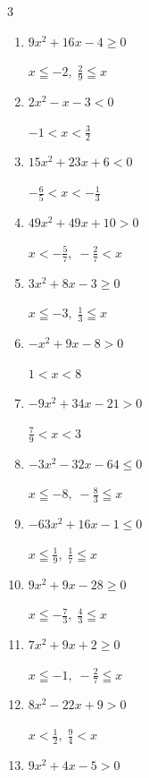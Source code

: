 \begin{multicols}{3}
\begin{enumerate}
  \item $9x^{2}+16x-4\geq 0$

        $\displaystyle x \leqq -2 , \; \frac{2}{9} \leqq x$

  \item $2x^{2}-x-3<0$

        $\displaystyle -1 < x < \frac{3}{2}$

  \item $15x^{2}+23x+6<0$

        $\displaystyle -\frac{6}{5} < x < -\frac{1}{3}$

  \item $49x^{2}+49x+10>0$

        $\displaystyle x < -\frac{5}{7} , \; -\frac{2}{7} < x$

  \item $3x^{2}+8x-3\geq 0$

        $\displaystyle x \leqq -3 , \; \frac{1}{3} \leqq x$

  \item $-x^{2}+9x-8>0$

        $\displaystyle 1 < x < 8$

  \item $-9x^{2}+34x-21>0$

        $\displaystyle \frac{7}{9} < x < 3$

  \item $-3x^{2}-32x-64\leq 0$

        $\displaystyle x \leqq -8 , \; -\frac{8}{3} \leqq x$

  \item $-63x^{2}+16x-1\leq 0$

        $\displaystyle x \leqq \frac{1}{9} , \; \frac{1}{7} \leqq x$

  \item $9x^{2}+9x-28\geq 0$

        $\displaystyle x \leqq -\frac{7}{3} , \; \frac{4}{3} \leqq x$

\columnbreak %

  \item $7x^{2}+9x+2\geq 0$

        $\displaystyle x \leqq -1 , \; -\frac{2}{7} \leqq x$

  \item $8x^{2}-22x+9>0$

        $\displaystyle x < \frac{1}{2} , \; \frac{9}{4} < x$

  \item $9x^{2}+4x-5>0$


\end{enumerate}
\end{multicols}
